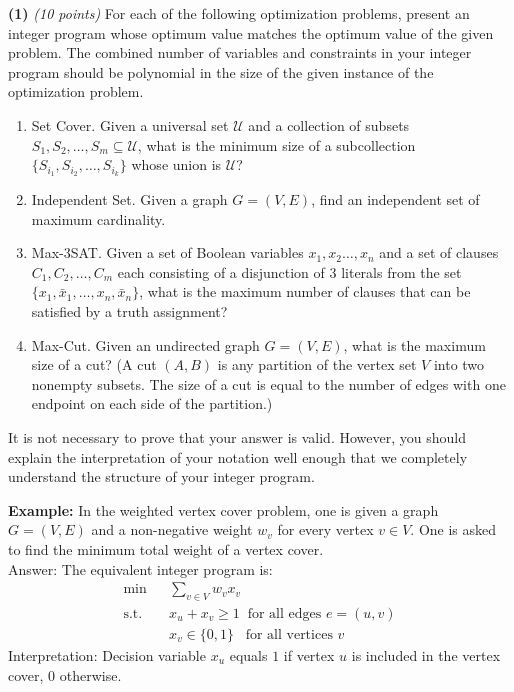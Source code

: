 \documentclass[11pt]{article}
\def\bigap{0.25in}
\begin{document}
\setlength{\parindent}{0in}
\addtolength{\parskip}{0.1cm}
\setlength{\fboxrule}{.5mm}\setlength{\fboxsep}{1.2mm}
\newlength{\boxlength}\setlength{\boxlength}{\textwidth}
\addtolength{\boxlength}{-4mm}
\begin{center}
\end{center}
\vspace{5mm}

{ \bf (1)} {\em (10 points)}
For each of the following optimization problems, present an 
integer program whose optimum value matches the optimum
value of the given problem.  The combined number of variables 
and constraints in your integer program should be polynomial
in the size of the given instance of the optimization problem.
\renewcommand{\theenumi}{(\roman{enumi})}
\begin{enumerate}
\item {\sc Set Cover}.  Given a universal set $\mathcal{U}$
and a collection of subsets $S_1,S_2,\ldots,S_m \subseteq \mathcal{U}$,
what is the minimum size of a subcollection
$\{S_{i_1},S_{i_2},\ldots,S_{i_k}\}$ whose union is $\mathcal{U}$?
\item  {\sc Independent Set}.  Given a graph $G=(V,E)$, 
find an independent set of maximum cardinality.
\item  {\sc Max-3SAT}.  Given a set of Boolean variables
$x_1,x_2\ldots,x_n$ and a set of clauses $C_1,C_2,\ldots,C_m$ each 
consisting of a disjunction of 3 literals from the set
$\{x_1,\bar{x}_1,\ldots,x_n,\bar{x}_n\}$, 
what is the  maximum number of clauses that can be 
satisfied by a truth assignment?
\item  {\sc Max-Cut}.  Given an undirected graph $G=(V,E)$,
what is the maximum size of a cut?
(A cut $(A,B)$ is any partition of the vertex set $V$ into two 
nonempty subsets.  The size of a cut is equal to the number
of edges with one
endpoint on each side of the partition.)
\end{enumerate}
It is not necessary to prove that your answer is valid.
However, you should explain the interpretation of 
your notation well enough 
that we completely understand the structure of your
integer program.

{\bf Example:}  In the weighted vertex cover problem, one
is given a graph $G=(V,E)$ and a non-negative weight $w_v$
for every vertex $v \in V$.  One is asked to find the
minimum total weight of a vertex cover.\\[1em]
{\sc Answer:}  The equivalent
integer program is:
\begin{eqnarray*}
\text{min} & & \sum_{v \in V} w_v x_v \\
\text{s.t.}
& & x_u + x_v \geq 1 \;\; \mbox{for all edges $e = (u,v)$} \\
& & x_v \in \{0,1\} \;\;\; \mbox{for all vertices $v$}
\end{eqnarray*}
{\sc Interpretation:} Decision variable $x_u$ equals $1$
if vertex $u$ is included in the vertex cover, $0$ otherwise.


\vskip \bigap

\end{document}
